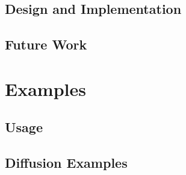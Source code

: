 \documentclass[tocAsPDFpart]{fipy}
\begin{document}




\chapter{Design and Implementation}
\label{chap:Design}





\chapter{Future Work}
\label{chap:ToDo}






\sloppy

\part{Examples}
\label{part:Examples}

\parttoc

\chapter{Usage}


\chapter{Diffusion Examples}


\newpage

\newpage

\newpage

\newpage

\newpage

\newpage

\newpage

\newpage

\newpage

\newpage

\newpage
\end{document}
